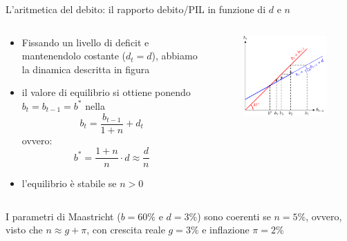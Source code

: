 \documentclass[aspectratio=149,11pt,italian]{beamer}
\begin{document}
\begin{frame}{L'aritmetica del debito: il rapporto debito/PIL in funzione di
    $d$ e $n$}

  \begin{columns}
    \begin{column}{.5\columnwidth}
      \begin{itemize}
      \item Fissando un livello di deficit e mantenendolo costante
        ($d_{t}=d$), abbiamo la dinamica descritta in figura
      \item il valore di equilibrio si ottiene ponendo $b_{t}=b_{t-1}=b^*$
        nella
        \begin{equation*}
          b_{t}=\frac{b_{t-1}}{1+n}+d_{t}
        \end{equation*}
        ovvero:
        \begin{equation*}
          b^*=\frac{1+n}{n}\cdot d \approx \frac{d}{n}
        \end{equation*}
      \item l'equilibrio è stabile se $n>0$
      \end{itemize}
    \end{column}

    \begin{column}{.5\columnwidth}
      \begin{figure}
        \centering
        \includegraphics[width=\textwidth]{./figure/debito-pubblico-sost-1.pdf}
      \end{figure}
    \end{column}
  \end{columns}
  
\begin{block}{}
  I parametri di Maastricht ($b=60\%$ e $d=3\%$) sono coerenti se $n=5\%$,
  ovvero, visto che $n\approx g + \pi$, con crescita reale $g=3\%$ e
  inflazione $\pi=2\%$
\end{block}

\end{frame}
\end{document}
